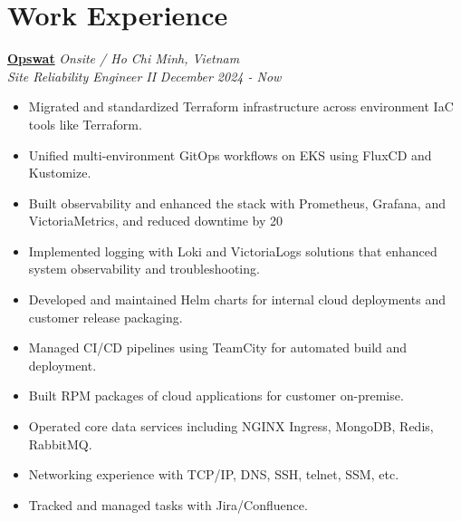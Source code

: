 \documentclass[11pt, a4paper]{article}
\begin{document}
\section{Work Experience}
\textbf{\href{https://www.opswat.com/}{Opswat}} \hfill {\small\textit{Onsite / Ho Chi Minh, Vietnam}} \\
\textit{Site Reliability Engineer II} \hfill {\small\textit{December 2024 - Now}}
\begin{itemize}[leftmargin=*]
    \item Migrated and standardized Terraform infrastructure across environment IaC tools like Terraform.
    \item Unified multi-environment GitOps workflows on EKS using FluxCD and Kustomize.
    \item Built observability and enhanced the stack with Prometheus, Grafana, and VictoriaMetrics, and reduced downtime by 20%
    \item Implemented logging with Loki and VictoriaLogs solutions that enhanced system observability and troubleshooting.
    \item Developed and maintained Helm charts for internal cloud deployments and customer release packaging.
    \item Managed CI/CD pipelines using TeamCity for automated build and deployment.
    \item Built RPM packages of cloud applications for customer on-premise.
    \item Operated core data services including NGINX Ingress, MongoDB, Redis, RabbitMQ.
    \item Networking experience with TCP/IP, DNS, SSH, telnet, SSM, etc.
    \item Tracked and managed tasks with Jira/Confluence.
\end{itemize}
\end{document}
